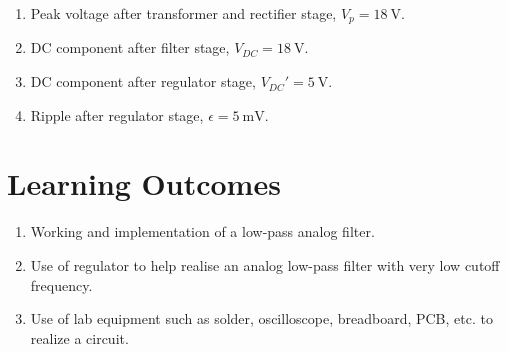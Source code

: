 \documentclass[journal,12pt,twocolumn]{IEEEtran}
\begin{document}
	\begin{enumerate}
		\item Peak voltage after transformer and rectifier stage, 
		$V_p = \SI[parse-numbers=false]{18}{\V}$.
		\item DC component after filter stage, 
		$V_{DC} = \SI[parse-numbers=false]{18}{\V}$.
		\item DC component after regulator stage, $V_{DC}' = \SI{5}{\V}$.
		\item Ripple after regulator stage, $\epsilon = \SI{5}{\milli\V}$.
	\end{enumerate}
	
	\section{Learning Outcomes}
	\begin{enumerate}
		\item Working and implementation of a low-pass analog filter.
		\item Use of regulator to help realise an analog low-pass filter with
		very low cutoff frequency.
		\item Use of lab equipment such as solder, oscilloscope, breadboard, PCB, etc.
		to realize a circuit.
	\end{enumerate}
\end{document}
